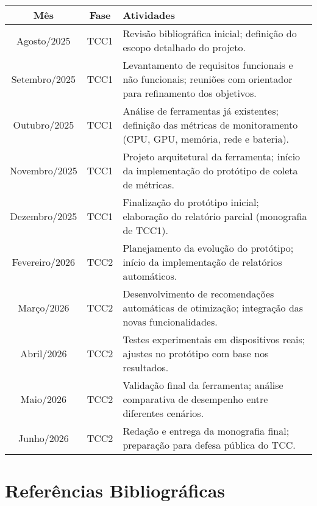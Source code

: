 \documentclass[12pt,a4paper]{article}
\begin{document}
\begin{longtable}{|c|c|p{10cm}|}
\hline
\textbf{Mês} & \textbf{Fase} & \textbf{Atividades} \\ \hline
Agosto/2025 & TCC1 & Revisão bibliográfica inicial; definição do escopo detalhado do projeto. \\ \hline
Setembro/2025 & TCC1 & Levantamento de requisitos funcionais e não funcionais; reuniões com orientador para refinamento dos objetivos. \\ \hline
Outubro/2025 & TCC1 & Análise de ferramentas já existentes; definição das métricas de monitoramento (CPU, GPU, memória, rede e bateria). \\ \hline
Novembro/2025 & TCC1 & Projeto arquitetural da ferramenta; início da implementação do protótipo de coleta de métricas. \\ \hline
Dezembro/2025 & TCC1 & Finalização do protótipo inicial; elaboração do relatório parcial (monografia de TCC1). \\ \hline
Fevereiro/2026 & TCC2 & Planejamento da evolução do protótipo; início da implementação de relatórios automáticos. \\ \hline
Março/2026 & TCC2 & Desenvolvimento de recomendações automáticas de otimização; integração das novas funcionalidades. \\ \hline
Abril/2026 & TCC2 & Testes experimentais em dispositivos reais; ajustes no protótipo com base nos resultados. \\ \hline
Maio/2026 & TCC2 & Validação final da ferramenta; análise comparativa de desempenho entre diferentes cenários. \\ \hline
Junho/2026 & TCC2 & Redação e entrega da monografia final; preparação para defesa pública do TCC. \\ \hline
\end{longtable}

\section{Referências Bibliográficas}
\end{document}
